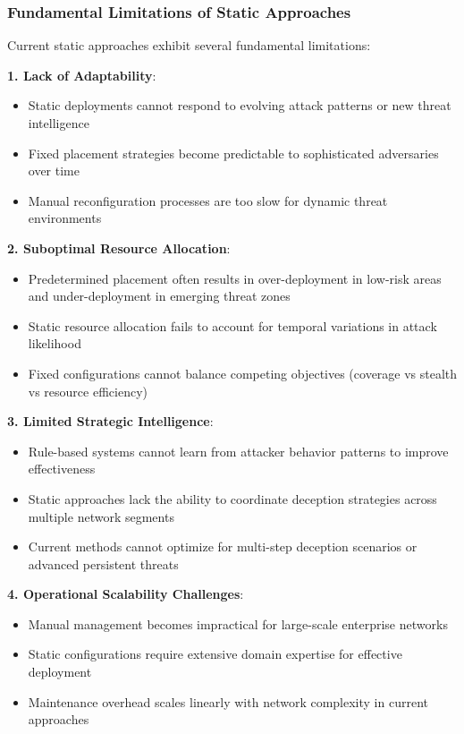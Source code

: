 \documentclass[12pt,oneside]{article}
\begin{document}
\subsubsection{Fundamental Limitations of Static Approaches}

Current static approaches exhibit several fundamental limitations:

\textbf{1. Lack of Adaptability}:
\begin{itemize}
\item Static deployments cannot respond to evolving attack patterns or new threat intelligence
\item Fixed placement strategies become predictable to sophisticated adversaries over time
\item Manual reconfiguration processes are too slow for dynamic threat environments
\end{itemize}

\textbf{2. Suboptimal Resource Allocation}:
\begin{itemize}
\item Predetermined placement often results in over-deployment in low-risk areas and under-deployment in emerging threat zones
\item Static resource allocation fails to account for temporal variations in attack likelihood
\item Fixed configurations cannot balance competing objectives (coverage vs stealth vs resource efficiency)
\end{itemize}

\textbf{3. Limited Strategic Intelligence}:
\begin{itemize}
\item Rule-based systems cannot learn from attacker behavior patterns to improve effectiveness
\item Static approaches lack the ability to coordinate deception strategies across multiple network segments
\item Current methods cannot optimize for multi-step deception scenarios or advanced persistent threats
\end{itemize}

\textbf{4. Operational Scalability Challenges}:
\begin{itemize}
\item Manual management becomes impractical for large-scale enterprise networks
\item Static configurations require extensive domain expertise for effective deployment
\item Maintenance overhead scales linearly with network complexity in current approaches
\end{itemize}
\end{document}
